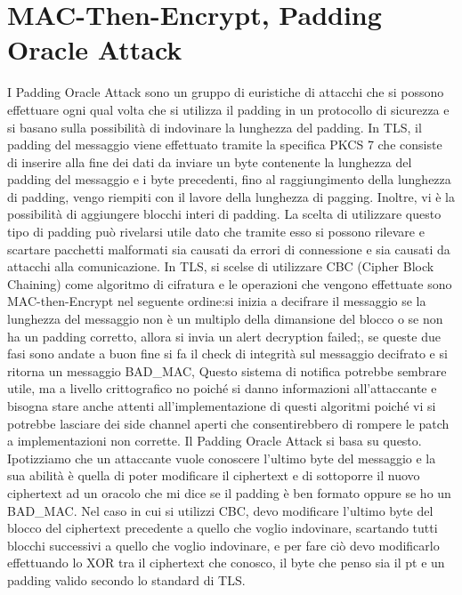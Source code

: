 \documentclass[a4paper,draft]{article}
\begin{document}
\section{MAC-Then-Encrypt, Padding Oracle Attack}
I Padding Oracle Attack sono un gruppo di euristiche di attacchi che si possono effettuare ogni qual volta che si utilizza il padding in un protocollo di sicurezza e si basano sulla possibilità di indovinare la lunghezza del padding\@.\newline
In TLS, il padding del messaggio viene effettuato tramite la specifica PKCS 7 che consiste di inserire alla fine dei dati da inviare un byte contenente la lunghezza del padding del messaggio e i byte precedenti, fino al raggiungimento della lunghezza di padding, vengo riempiti con il lavore della lunghezza di pagging\@.
Inoltre, vi è la possibilità di aggiungere blocchi interi di padding\@.\newline
La scelta di utilizzare questo tipo di padding può rivelarsi utile dato che tramite esso si possono rilevare e scartare pacchetti malformati sia causati da errori di connessione e sia causati da attacchi alla comunicazione\@.\newline
In TLS, si scelse di utilizzare CBC (Cipher Block Chaining) come algoritmo di cifratura e le operazioni che vengono effettuate sono MAC-then-Encrypt nel seguente ordine:\@prima si inizia a decifrare il messaggio se la lunghezza del messaggio non è un multiplo della dimansione del blocco o se non ha un padding corretto, allora si invia un alert decryption failed;\@inoltre, se queste due fasi sono andate a buon fine si fa il check di integrità sul messaggio decifrato e si ritorna un messaggio BAD\_MAC\@,\newline
Questo sistema di notifica potrebbe sembrare utile, ma a livello crittografico no poiché si danno informazioni all'attaccante e bisogna stare anche attenti all'implementazione di questi algoritmi poiché vi si potrebbe lasciare dei side channel aperti che consentirebbero di rompere le patch a implementazioni non corrette\@. Il Padding Oracle Attack si basa su questo\@.\newline
Ipotizziamo che un attaccante vuole conoscere l'ultimo byte del messaggio e la sua abilità è quella di poter modificare il ciphertext e di sottoporre il nuovo ciphertext ad un oracolo che mi dice se il padding è ben formato oppure se ho un BAD\_MAC\@.
Nel caso in cui si utilizzi CBC, devo modificare l'ultimo byte del blocco del ciphertext precedente a quello che voglio indovinare, scartando tutti blocchi successivi a quello che voglio indovinare, e per fare ciò devo modificarlo effettuando lo XOR tra il ciphertext che conosco, il byte che penso sia il pt e un padding valido secondo lo standard di TLS\@.
\end{document}
